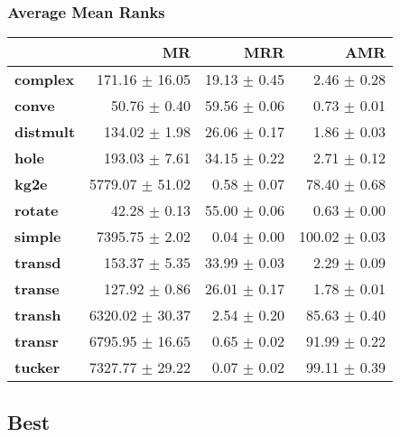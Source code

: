\documentclass{article}
\begin{document}
    \subsubsection{Average Mean Ranks}
    \begin{center}
    \begin{tabular}{lrrr}
\toprule
{} &               MR &           MRR &            AMR \\
\midrule
\textbf{complex } &   171.16 $\pm$ 16.05 &  19.13 $\pm$ 0.45 &    2.46 $\pm$ 0.28 \\
\textbf{conve   } &     50.76 $\pm$ 0.40 &  59.56 $\pm$ 0.06 &    0.73 $\pm$ 0.01 \\
\textbf{distmult} &    134.02 $\pm$ 1.98 &  26.06 $\pm$ 0.17 &    1.86 $\pm$ 0.03 \\
\textbf{hole    } &    193.03 $\pm$ 7.61 &  34.15 $\pm$ 0.22 &    2.71 $\pm$ 0.12 \\
\textbf{kg2e    } &  5779.07 $\pm$ 51.02 &   0.58 $\pm$ 0.07 &   78.40 $\pm$ 0.68 \\
\textbf{rotate  } &     42.28 $\pm$ 0.13 &  55.00 $\pm$ 0.06 &    0.63 $\pm$ 0.00 \\
\textbf{simple  } &   7395.75 $\pm$ 2.02 &   0.04 $\pm$ 0.00 &  100.02 $\pm$ 0.03 \\
\textbf{transd  } &    153.37 $\pm$ 5.35 &  33.99 $\pm$ 0.03 &    2.29 $\pm$ 0.09 \\
\textbf{transe  } &    127.92 $\pm$ 0.86 &  26.01 $\pm$ 0.17 &    1.78 $\pm$ 0.01 \\
\textbf{transh  } &  6320.02 $\pm$ 30.37 &   2.54 $\pm$ 0.20 &   85.63 $\pm$ 0.40 \\
\textbf{transr  } &  6795.95 $\pm$ 16.65 &   0.65 $\pm$ 0.02 &   91.99 $\pm$ 0.22 \\
\textbf{tucker  } &  7327.77 $\pm$ 29.22 &   0.07 $\pm$ 0.02 &   99.11 $\pm$ 0.39 \\
\bottomrule
\end{tabular}

    \end{center}
    \subsection{Best}
\end{document}

